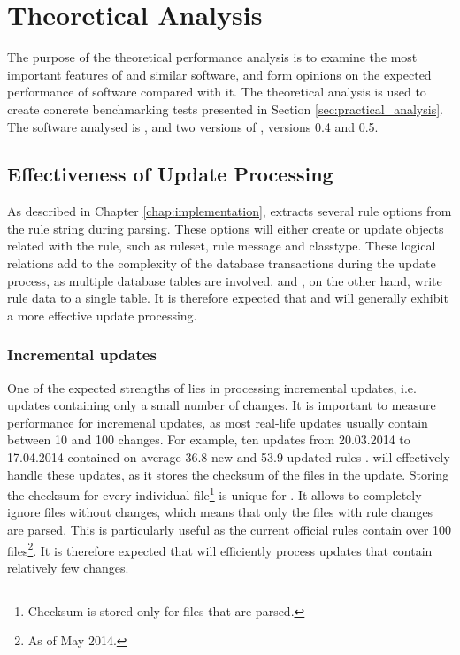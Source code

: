 \section{Theoretical Analysis}
The purpose of the theoretical performance analysis is to examine the most
important features of \snowman{} and similar software, and form opinions on the
expected performance of software compared with it. The theoretical analysis is
used to create concrete benchmarking tests presented in Section
\ref{sec:practical_analysis}.
The software analysed is \bhtb{}, \snortmanager{} and two versions of
\snowman{}, versions 0.4 and 0.5.

\subsection{Effectiveness of Update Processing}
As described in Chapter \ref{chap:implementation}, \snowman{} extracts several
rule options from the rule string during parsing. These options will either
create or update objects related with the rule, such as ruleset, rule message
and classtype. These logical relations add to the complexity of the database
transactions during the update process, as multiple database tables are
involved. \bhtb{} and \snortmanager{}, on the other hand, write rule data to a
single table. It is therefore expected that \bhtb{} and
\snortmanager{} will generally exhibit a more effective update processing.


\subsubsection{Incremental updates}
One of the expected strengths of \snowman{} lies in processing incremental
updates, i.e. updates containing only a small number of changes. It is
important to measure performance for incremenal updates, as most real-life
updates usually contain between 10 and 100 changes. For example, ten updates
from 20.03.2014 to 17.04.2014 contained on average 36.8 new and 53.9 updated
rules \cite{vrt_advisories}. \snowman{} will
effectively handle these updates, as it stores the checksum of the files in the
update. Storing the checksum for every individual file\footnote{Checksum is
stored only for files that are parsed.} is unique for \snowman{}. It allows
\snowman{} to completely ignore files without changes, which means that only
the files with rule changes are parsed. This is particularly useful as the
current official \snort{} rules contain over 100 files\footnote{As of May
2014.}.
It is therefore expected that \snowman{} will efficiently process updates that
contain relatively few changes.

